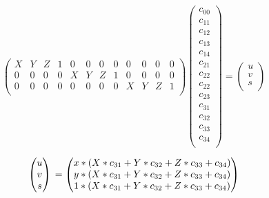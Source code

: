 \documentclass[11pt,a4paper,titlepage,oneside]{report}
\begin{document}
\setcounter{MaxMatrixCols}{15}
\begin{equation}\label{eq:projection_flat}
	\begin{pmatrix}
		X & Y & Z & 1 & 0 & 0 & 0 & 0 & 0 & 0 & 0 & 0\\
		0 & 0 & 0 & 0 & X & Y & Z & 1 & 0 & 0 & 0 & 0\\
		0 & 0 & 0 & 0 & 0 & 0 & 0 & 0 & X & Y & Z & 1\\
	\end{pmatrix}
	\begin{pmatrix}c_{00}\\
		c_{11}\\
		c_{12}\\
		c_{13}\\
		c_{14}\\
		c_{21}\\
		c_{22}\\
		c_{22}\\
		c_{23}\\
		c_{31}\\
		c_{32}\\
		c_{33}\\
		c_{34} \\
	\end{pmatrix}=
	\begin{pmatrix}u\\
		v\\
		s\\
	\end{pmatrix}
\end{equation}

\begin{equation}\label{eq:projection_flat_s}
	\begin{pmatrix}u\\
		v\\
		s\\
	\end{pmatrix}\\=
	\begin{pmatrix}x*(X*c_{31}+Y*c_{32}+Z*c_{33}+c_{34})\\
		y*(X*c_{31}+Y*c_{32}+Z*c_{33}+c_{34})\\
		1*(X*c_{31}+Y*c_{32}+Z*c_{33}+c_{34})\\
	\end{pmatrix}
\end{equation}
\end{document}
